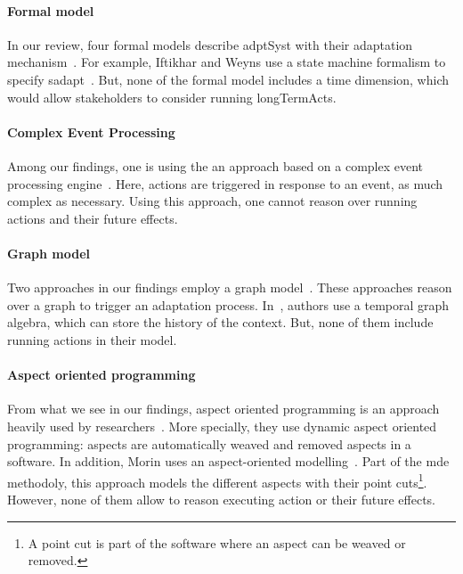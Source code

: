 \paragraph{Formal model}
In our review, four formal models describe \gls{adptSyst} with their adaptation mechanism~\cite{DBLP:journals/taas/WeynsMA12, DBLP:conf/icse/IftikharW14a, DBLP:journals/taas/WeynsHH10, DBLP:conf/icse/BartelsK11}.
For example, Iftikhar and Weyns use a state machine formalism to specify \gls{sadapt}~\cite{DBLP:conf/icse/IftikharW14a}.
But, none of the formal model includes a time dimension, which would allow stakeholders to consider running \glspl{longTermAct}.

\paragraph{Complex Event Processing}
Among our findings, one is using the an approach based on a complex event processing engine~\cite{DBLP:conf/rr/AnicicFRSSS10}.
Here, \glspl{action} are triggered in response to an event, as much complex as necessary.
Using this approach, one cannot reason over running \glspl{action} and their future effects.

\paragraph{Graph model}
Two approaches in our findings employ a graph model~\cite{DBLP:journals/tse/KramerM90, DBLP:conf/dbpl/MoffittS17}.
These approaches reason over a graph to trigger an adaptation process.
In~\cite{DBLP:conf/dbpl/MoffittS17}, authors use a temporal graph algebra, which can store the history of the context.
But, none of them include running \glspl{action} in their model.
	
\paragraph{Aspect oriented programming}
From what we see in our findings, aspect oriented programming is an approach heavily used by researchers~\cite{DBLP:journals/taosd/GreenwoodB06, DBLP:conf/soco/DavidL06, DBLP:conf/icws/CharfiDM09, DBLP:journals/scp/ParraBCD11, DBLP:conf/ewsa/FalcarinA04, DBLP:conf/gpce/PintoFT03}.
More specially, they use dynamic aspect oriented programming: aspects are automatically weaved and removed aspects in a software.
In addition, Morin \etal uses an aspect-oriented modelling~\cite{DBLP:conf/icse/MorinBNJ09}.
Part of the \gls{mde} methodoly, this approach models the different aspects with their point cuts\footnote{A point cut is part of the software where an aspect can be weaved or removed.}.
However, none of them allow to reason executing \gls{action} or their future effects.
	

